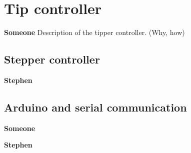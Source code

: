 \section{Tip controller} %
\label{sec:mr_tip_controller}
\textbf{Someone}
Description of the tipper controller. (Why, how)

\subsection{Stepper controller} %
\label{sub:stepper_controller}
\textbf{Stephen}

\subsection{Arduino and serial communication} %
\label{sub:arduino_and_serial_communication}
\textbf{Someone}

\textbf{Stephen}

